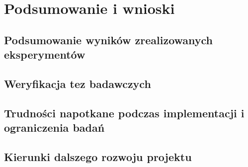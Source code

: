 \chapter{Podsumowanie i wnioski}

{%

\section{Podsumowanie wyników zrealizowanych eksperymentów}
\section{Weryfikacja tez badawczych}
\section{Trudności napotkane podczas implementacji i ograniczenia badań}
\section{Kierunki dalszego rozwoju projektu}
}